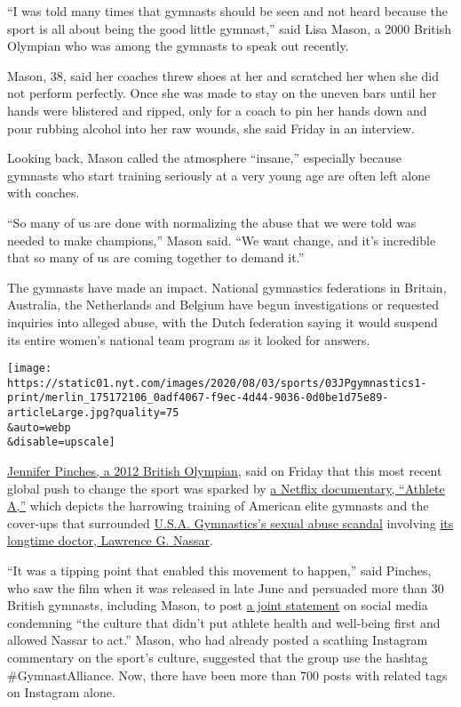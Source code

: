 ``I was told many times that gymnasts should be seen and not heard
because the sport is all about being the good little gymnast,'' said
Lisa Mason, a 2000 British Olympian who was among the gymnasts to speak
out recently.

Mason, 38, said her coaches threw shoes at her and scratched her when
she did not perform perfectly. Once she was made to stay on the uneven
bars until her hands were blistered and ripped, only for a coach to pin
her hands down and pour rubbing alcohol into her raw wounds, she said
Friday in an interview.

Looking back, Mason called the atmosphere ``insane,'' especially because
gymnasts who start training seriously at a very young age are often left
alone with coaches.

``So many of us are done with normalizing the abuse that we were told
was needed to make champions,'' Mason said. ``We want change, and it's
incredible that so many of us are coming together to demand it.''

The gymnasts have made an impact. National gymnastics federations in
Britain, Australia, the Netherlands and Belgium have begun
investigations or requested inquiries into alleged abuse, with the Dutch
federation saying it would suspend its entire women's national team
program as it looked for answers.

\texttt{[image: https://static01.nyt.com/images/2020/08/03/sports/03JPgymnastics1-print/merlin\_175172106\_0adf4067-f9ec-4d44-9036-0d0be1d75e89-articleLarge.jpg?quality=75\\\&auto=webp\\\&disable=upscale]}

\href{https://www.telegraph.co.uk/gymnastics/2020/07/08/culture-fear-permeating-whole-gymnastics-has-stop/}{Jennifer
Pinches, a 2012 British Olympian}, said on Friday that this most recent
global push to change the sport was sparked by
\href{https://www.nytimes.com/2020/06/24/movies/athlete-a-review.html}{a
Netflix documentary, ``Athlete A,''} which depicts the harrowing
training of American elite gymnasts and the cover-ups that surrounded
\href{https://www.nytimes.com/2020/03/03/sports/olympics/biles-gymnastics-settlement-nassar.html?searchResultPosition=3}{U.S.A.
Gymnastics's sexual abuse scandal} involving
\href{https://www.nytimes.com/video/us/100000005698488/larry-nassar-gymnastics-sex-abuse.html?searchResultPosition=7}{its
longtime doctor, Lawrence G. Nassar}.

``It was a tipping point that enabled this movement to happen,'' said
Pinches, who saw the film when it was released in late June and
persuaded more than 30 British gymnasts, including Mason, to post
\href{https://www.instagram.com/p/CCBs9R1DPFh/}{a joint statement} on
social media condemning ``the culture that didn't put athlete health and
well-being first and allowed Nassar to act.'' Mason, who had already
posted a scathing Instagram commentary on the sport's culture, suggested
that the group use the hashtag \#GymnastAlliance. Now, there have been
more than 700 posts with related tags on Instagram alone.

